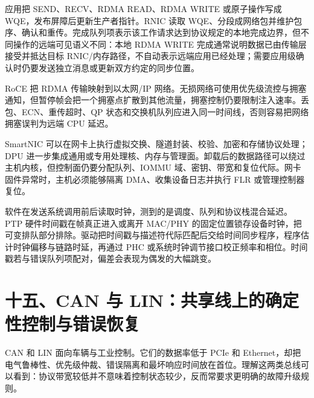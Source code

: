 
应用把 SEND、RECV、RDMA READ、RDMA WRITE 或原子操作写成 WQE，发布屏障后更新生产者指针。RNIC 读取 WQE、分段成网络包并维护包序、确认和重传。完成队列项表示该工作请求达到协议规定的本地完成边界，但不同操作的远端可见语义不同：本地 RDMA WRITE 完成通常说明数据已由传输层接受并抵达目标 RNIC/内存路径，不自动表示远端应用已经处理；需要应用级确认时仍要发送独立消息或更新双方约定的同步位置。

RoCE 把 RDMA 传输映射到以太网/IP 网络。无损网络可使用优先级流控与拥塞通知，但暂停帧会把一个拥塞点扩散到其他流量，拥塞控制仍要限制注入速率。丢包、ECN、重传超时、QP 状态和交换机队列应进入同一时间线，否则容易把网络拥塞误判为远端 CPU 延迟。


SmartNIC 可以在网卡上执行虚拟交换、隧道封装、校验、加密和存储协议处理；DPU 进一步集成通用或专用处理核、内存与管理面。卸载后的数据路径可以绕过主机内核，但控制面仍要分配队列、IOMMU 域、密钥、带宽和复位代际。网卡固件异常时，主机必须能够隔离 DMA、收集设备日志并执行 FLR 或管理控制器复位。


软件在发送系统调用前后读取时钟，测到的是调度、队列和协议栈混合延迟。PTP 硬件时间戳在帧真正进入或离开 MAC/PHY 的固定位置锁存设备时钟，把可变排队部分排除。驱动把时间戳与描述符代际匹配后交给时间同步程序，程序估计时钟偏移与链路时延，再通过 PHC 或系统时钟调节接口校正频率和相位。时间戳若与错误队列项配对，偏差会表现为偶发的大幅跳变。

\section{十五、CAN 与 LIN：共享线上的确定性控制与错误恢复}

CAN 和 LIN 面向车辆与工业控制。它们的数据率低于 PCIe 和 Ethernet，却把电气鲁棒性、优先级仲裁、错误隔离和最坏响应时间放在首位。理解这两类总线可以看到：协议带宽较低并不意味着控制状态较少，反而常要求更明确的故障升级规则。

